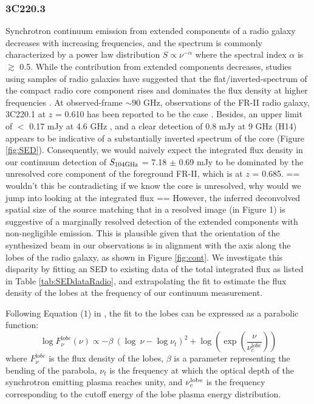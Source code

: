 \documentclass[twocolumn,apj,numberedappendix]{emulateapj}
\begin{document}
\subsubsection{3C220.3}
Synchrotron continuum emission from extended components of a radio galaxy decreases with increasing frequencies, 
and the spectrum is commonly characterized by a power law distribution $S \propto \nu^{-\alpha}$ where the 
spectral index $\alpha$ is $\gtrsim$ 0.5. While the contribution from extended components decreases, studies using 
samples of radio galaxies have suggested that the flat/inverted-spectrum of the compact radio core component rises 
and dominates the flux density at higher frequencies \citep{Kellermann81a,Begelman84a}. At observed-frame $\sim$90 GHz, 
observations of the FR-II radio galaxy, 3C220.1 at $z$ = 0.610 has been reported to be the case 
\citep{Hardcastle08a}. Besides, an upper 
limit of $<$ 0.17 mJy at 4.6 GHz \citep{Mullin06a}, and a clear detection of 0.8 mJy at 9 GHz (H14) appears to 
be indicative of a substantially inverted spectrum of the core (Figure \ref{fig:SED}).
Consequently, we would naively expect the integrated flux density in our continuum detection of $S_{\rm 104GHz}$ = 7.18 $\pm$ 0.69 mJy to be dominated by the unresolved core component of the foreground FR-II, which is at $z$ = 0.685. == wouldn't this be contradicting if we know the core is unresolved, why would we jump into looking at the integrated flux ==
However, the inferred deconvolved spatial size of the source matching that in a resolved image (in Figure 1) is 
suggestive of a marginally resolved detection of the extended components with non-negligible emission. 
This is plausible given that the orientation of the synthesized beam in our observations is in alignment with the 
axis along the 
lobes of the radio galaxy, as shown in Figure \ref{fig:cont}. We investigate this disparity by fitting an SED to 
existing data of the total integrated flux as listed in Table \ref{tab:SEDdataRadio}, and extrapolating the fit to 
estimate the flux density of the lobes at the frequency of our continuum measurement. 

Following Equation (1) in \citet{Cleary07a}, the fit to the lobes can be expressed as a parabolic function:
\begin{equation}
\log F_{\nu}^{\mathrm lobe} (\nu) \propto - \beta\ (\log\ \nu - \log \nu_{t})^2  + \log (\exp({\frac{\nu}{\nu_c^{\mathrm lobe}}}))
\end{equation}
where $F_{\nu}^{\mathrm lobe}$ is the flux density of the lobes, $\beta$ is a parameter representing the bending of the parabola, $\nu_t$ is the frequency at which the optical depth of the synchrotron emitting plasma reaches unity, and $\nu_c^{\rm lobe}$ is the frequency corresponding to the cutoff energy of the lobe plasma energy distribution. 
\end{document}
